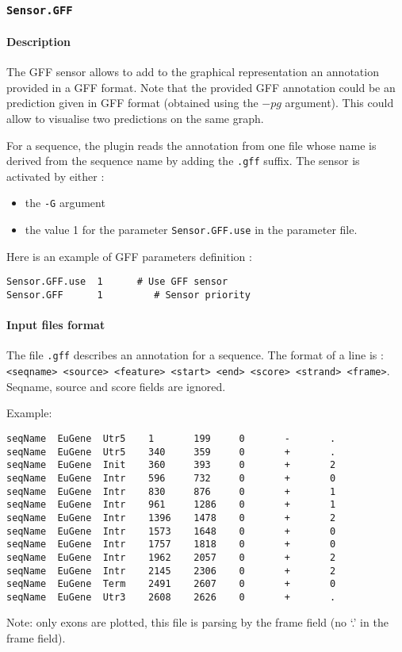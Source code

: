 
\subsubsection{\texttt{Sensor.GFF}}

\paragraph{Description}

The GFF sensor allows to add to the graphical representation an
annotation provided in a GFF format. Note that the provided GFF
annotation could be an \EuGene prediction given in GFF format
(obtained using the $-pg$ argument). This could allow to visualise two
predictions on the same graph.

For a sequence, the plugin reads the annotation from one file whose
name is derived from the sequence name by adding the \texttt{.gff}
suffix.  The sensor is activated by either :
\begin{itemize}
\item the \texttt{-G} argument 
\item the value 1 for the parameter \texttt{Sensor.GFF.use} in the
  parameter file.
\end{itemize}
Here is an example of GFF parameters definition :
\begin{Verbatim}[fontsize=\small]
Sensor.GFF.use  1      # Use GFF sensor
Sensor.GFF      1         # Sensor priority
\end{Verbatim}

\paragraph{Input files format}

The file \texttt{.gff} describes an annotation for a sequence. The format of
a line is : \texttt{<seqname> <source> <feature> <start> <end> <score>
  <strand> <frame>}. Seqname, source and score fields are ignored.

Example:
\begin{Verbatim}[fontsize=\small]
seqName  EuGene  Utr5    1       199     0       -       .
seqName  EuGene  Utr5    340     359     0       +       .
seqName  EuGene  Init    360     393     0       +       2
seqName  EuGene  Intr    596     732     0       +       0
seqName  EuGene  Intr    830     876     0       +       1
seqName  EuGene  Intr    961     1286    0       +       1
seqName  EuGene  Intr    1396    1478    0       +       2
seqName  EuGene  Intr    1573    1648    0       +       0
seqName  EuGene  Intr    1757    1818    0       +       0
seqName  EuGene  Intr    1962    2057    0       +       2
seqName  EuGene  Intr    2145    2306    0       +       2
seqName  EuGene  Term    2491    2607    0       +       0
seqName  EuGene  Utr3    2608    2626    0       +       .
\end{Verbatim}
Note: only exons are plotted, this file is parsing by the frame field
(no `.' in the frame field).

